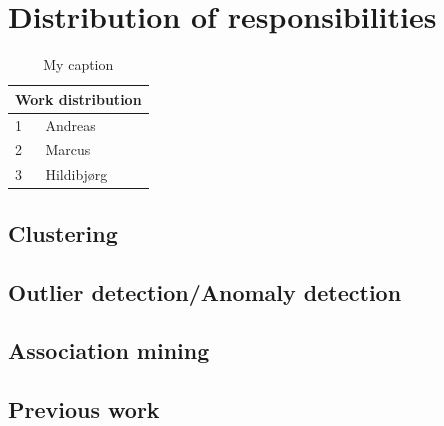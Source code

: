 \appendix
\section{Distribution of responsibilities}
\begin{table}[]
\centering
\caption{My caption}
\label{my-label}
\begin{tabular}{ll}
\hline
\multicolumn{2}{|l|}{Work distribution} \\ \hline
1              & Andreas                \\
2              & Marcus                 \\
3              & Hildibjørg
\end{tabular}
\end{table}
\subsection{Clustering}

\subsection{Outlier detection/Anomaly detection}

\subsection{Association mining}

\subsection{Previous work}
